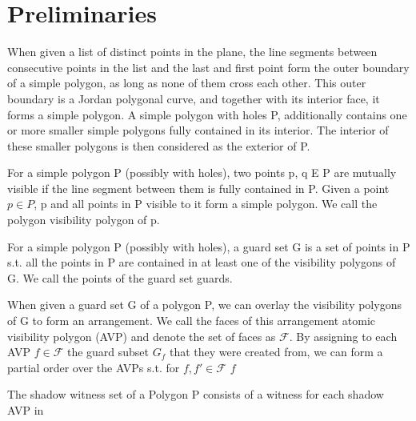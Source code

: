 \chapter{Preliminaries}
\begin{definition}
When given a list of distinct points in the plane, the line segments between consecutive points in the list and the last and first point form the outer boundary of a simple polygon, as long as none of them cross each other. This outer boundary is a Jordan polygonal curve, and together with its interior face, it forms a simple polygon. A simple polygon with holes P, additionally contains one or more smaller simple polygons fully contained in its interior. The interior of these smaller polygons is then considered as the exterior of P.
\end{definition}

\begin{definition}
For a simple polygon P (possibly with holes), two points p, q E P are mutually visible if the line segment between them is fully contained in P. Given a point $p\in P$, p and all points in P visible to it form a simple polygon. We call the polygon visibility polygon of p.
\end{definition}

\begin{definition}
For a simple polygon P (possibly with holes), a guard set G is a set of points in P s.t. all the points in P are contained in at least one of the visibility polygons of G. We call the points of the guard set guards.
\end{definition}

\begin{definition}
When given a guard set G of a polygon P, we can overlay the visibility polygons of G to form an arrangement. We call the faces of this arrangement atomic visibility polygon (AVP) and denote the set of faces as $\mathcal{F}$. By assigning to each AVP $f\in\mathcal{F}$ the guard subset $G_{f}$ that they were created from, we can form a partial order over the AVPs s.t. for $f,f'\in\mathcal{F}$ $f$
\end{definition}

\begin{definition}
The shadow witness set of a Polygon P consists of a witness for each shadow AVP in 
\end{definition}

\begin{definition}
    
\end{definition}

\begin{definition}
    
\end{definition}

\begin{definition}
    
\end{definition}

\begin{definition}
    
\end{definition}